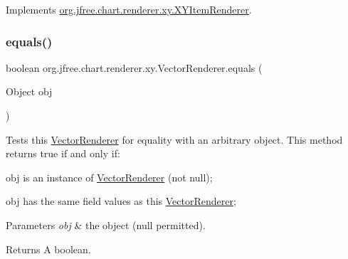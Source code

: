 Implements \mbox{\hyperlink{interfaceorg_1_1jfree_1_1chart_1_1renderer_1_1xy_1_1_x_y_item_renderer_ad867040a3ea09f5127596aacdd94586a}{org.\+jfree.\+chart.\+renderer.\+xy.\+X\+Y\+Item\+Renderer}}.

\mbox{\label{classorg_1_1jfree_1_1chart_1_1renderer_1_1xy_1_1_vector_renderer_a3b0ed70aecb3d2d43d0b68ac565eacc5}} 
\subsubsection{\texorpdfstring{equals()}{equals()}}
{\footnotesize\ttfamily boolean org.\+jfree.\+chart.\+renderer.\+xy.\+Vector\+Renderer.\+equals (\begin{DoxyParamCaption}\item[{Object}]{obj }\end{DoxyParamCaption})}

Tests this {\ttfamily \mbox{\hyperlink{classorg_1_1jfree_1_1chart_1_1renderer_1_1xy_1_1_vector_renderer}{Vector\+Renderer}}} for equality with an arbitrary object. This method returns {\ttfamily true} if and only if\+: 
\begin{DoxyItemize}
\item {\ttfamily obj} is an instance of {\ttfamily \mbox{\hyperlink{classorg_1_1jfree_1_1chart_1_1renderer_1_1xy_1_1_vector_renderer}{Vector\+Renderer}}} (not {\ttfamily null}); 
\item {\ttfamily obj} has the same field values as this {\ttfamily \mbox{\hyperlink{classorg_1_1jfree_1_1chart_1_1renderer_1_1xy_1_1_vector_renderer}{Vector\+Renderer}}}; 
\end{DoxyItemize}


\begin{DoxyParams}{Parameters}
{\em obj} & the object ({\ttfamily null} permitted).\\
\hline
\end{DoxyParams}
\begin{DoxyReturn}{Returns}
A boolean. 
\end{DoxyReturn}
\mbox{\label{classorg_1_1jfree_1_1chart_1_1renderer_1_1xy_1_1_vector_renderer_a05a8f9e4032e5aff9947ecb614ebfe82}} 
